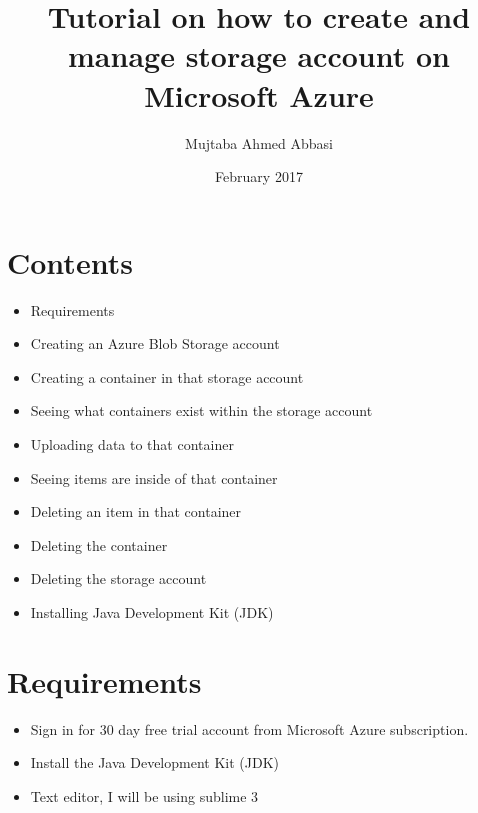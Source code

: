 \documentclass[12pt, letterpaper, twoside]{article}
\title{\textbf{Tutorial on how to create and manage storage account on Microsoft Azure}}
\author{Mujtaba Ahmed Abbasi}
\date{February 2017}
\begin{document}
	
	\begin{titlepage}
		\clearpage\maketitle
		\thispagestyle{empty}
	\end{titlepage}
	

\setcounter{page}{1}

\section*{\textbf{Contents}}
\begin{itemize}
	\item{\large{Requirements}} 
	\item{\large{Creating an Azure Blob Storage account}}
	\item{\large{Creating a container in that storage account}}
	\item{\large{Seeing what containers exist within the storage account}}
	\item{\large{Uploading data to that container}}
	\item{\large{Seeing items are inside of that container}}
	\item{\large{Deleting an item in that container}}
	\item{\large{Deleting the container}}
	\item{\large{Deleting the storage account}}
	\item{\large{Installing Java Development Kit (JDK)}}
\end{itemize}
\clearpage

\section*{\textbf{Requirements}}
\begin{itemize}
	\item{\large{Sign in for 30 day free trial account from Microsoft Azure subscription.}}
	\item{\large{Install the Java Development Kit (JDK)}}
	\item{\large{Text editor, I will be using sublime 3}}
	
\end{itemize}
\clearpage

	
	
\end{document}
